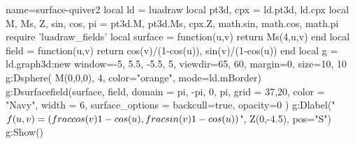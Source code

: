 \begin{luadraw}{name=surface-quiver2}
local ld = luadraw
local pt3d, cpx = ld.pt3d, ld.cpx
local M, Ms, Z, sin, cos, pi = pt3d.M, pt3d.Ms, cpx.Z, math.sin, math.cos, math.pi
require 'luadraw_fields'
local surface = function(u,v) return Ms(4,u,v) end
local field = function(u,v) return {cos(v)/(1-cos(u)), sin(v)/(1-cos(u))} end
local g = ld.graph3d:new{ window={-5, 5.5, -5.5, 5}, viewdir={65, 60}, margin=0, size={10, 10} }
g:Dsphere( M(0,0,0), 4, {color="orange", mode=ld.mBorder})
g:Dsurfacefield(surface, field, {
    domain = {pi, -pi, 0, pi},
    grid = {37,20},
    color = "Navy",
    width = 6,
    surface_options = {backcull=true, opacity=0}
    })
g:Dlabel("$f(u,v)= (\\frac{\\cos(v)}{1-\\cos(u)},\\frac{\\sin(v)}{1-\\cos(u)})$", Z(0,-4.5), {pos="S"})
g:Show()
\end{luadraw}
